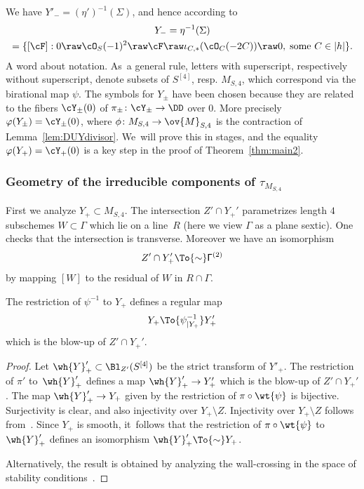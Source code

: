We have $Y'_{-}=(\eta')^{-1}(\Sigma)$, and hence according to~\cite[Prop.\,5.1]{involutions1}
\begin{multline}\label{eccoymeno}
Y_{-}=\eta^{-1}(\Sigma)\\
=\{[\cF] :0\raw \cO_S(-1)^{ 2}\raw \cF\raw \iota_{C,*}(\cO_C(-2C))\raw 0,\; \text{some $C\in|h|$} \}.
\end{multline}
A word about notation. As~a general rule, letters with superscript, respectively without superscript, denote subsets of $S^{[4]}$, resp. $M_{S,4}$, which correspond via the birational map $\psi$. The symbols for $Y_{\pm}$ have been chosen because they are related to the fibers $\cY_{\pm}(0)$ of $\pi_{\pm}\colon \cY_{\pm}\to\DD$ over $0$.
More precisely $\varphi(Y_{\pm})=\cY_{\pm}(0)$, where $\phi\colon M_{S,4}\to\ov{M}_{S,4}$ is the contraction of Lemma~\ref{lem:DUYdivisor}. We~will prove this in stages, and the equality $\varphi(Y_{+})=\cY_{+}(0)$ is a key step in the proof of Theorem~\ref{thm:main2}.

\subsubsection*{Geometry of the irreducible components of $\tau_{M_{S,4}}$}
First we analyze $Y_{+}\subset M_{S,4}$. The intersection $Z'\cap Y_+'$ parametrizes length $4$ subschemes $W\subset\mathsf{\Gamma}$ which lie on a line~$R$ (here we view $\mathsf{\Gamma}$ as a plane sextic).
One checks that the intersection is transverse. Moreover we have an isomorphism
\begin{equation*}
Z'\cap Y_+' \To{\sim} \mathsf{\Gamma}^{(2)}
\end{equation*}
by mapping $[W]$ to the residual of $W$ in
$R\cap\mathsf{\Gamma}$.

\begin{prop}\label{prop:ipspiublow}
The restriction of $\psi^{-1}$ to $Y_{+}$ defines a regular map
\begin{equation*}
Y_{+}\To{\psi^{-1}_{|Y_{+}}} Y'_{+}
\end{equation*}
which is the blow-up of $Z'\cap Y_+'$.
\end{prop}

\begin{proof}
Let $\wh{Y}'_{+}\subset\Bl_{Z'}(S^{[4]})$ be the strict transform of $Y'_{+}$. The restriction of $\pi'$ to~$\wh{Y}'_{+}$ defines a map $\wh{Y}'_{+}\to Y'_{+}$ which is the blow-up of $Z'\cap Y_+'$. The map
$\wh{Y}'_{+}\to Y_{+}$ given by the restriction of $\pi\circ\wt{\psi}$ is bijective.
Surjectivity is clear, and also injectivity over $Y_{+}\setminus Z$. Injectivity over $Y_{+}\setminus Z$ follows from~\cite[Prop.\,5.2]{involutions1}. Since $Y_{+}$ is smooth, it~follows that the restriction of $\pi\circ\wt{\psi}$ to $\wh{Y}'_{+}$ defines an isomorphism $\wh{Y}'_{+}\To{\sim} Y_{+}$.

Alternatively, the result is obtained by analyzing the wall-crossing in the space of stability conditions~\cite[\S 9]{BM:walls}.
\end{proof}

